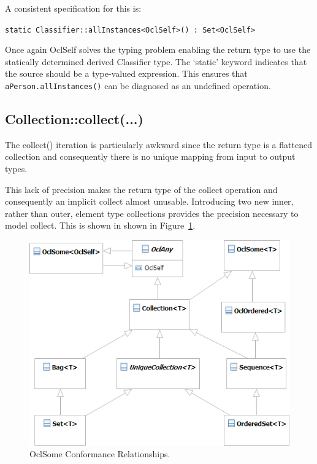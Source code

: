 \documentclass{eceasst}
\begin{document}
A consistent specification for this is:

\verb!static Classifier::allInstances<OclSelf>() : Set<OclSelf>!

Once again OclSelf solves the typing problem enabling the return type to use the statically determined derived Classifier type. The `static' keyword indicates that the source should be a type-valued expression. This ensures that  \verb!aPerson.allInstances()! can be diagnosed as an undefined operation.

\subsection{Collection::collect(...)}

The collect() iteration is particularly awkward since the return type is a flattened collection and consequently there is no unique mapping from input to output types. 


This lack of precision makes the return type of the collect operation and consequently an implicit collect almost unusable. Introducing two new inner, rather than outer, element type collections provides the precision necessary to model collect. This is shown in shown in Figure~\ref{fig:OclSome}.

\begin{figure}
  \begin{center}
    \includegraphics[width=4.5in]{OclSome.png}
  \end{center}
  \caption{OclSome Conformance Relationships.}
  \label{fig:OclSome}
\end{figure}
\end{document}
